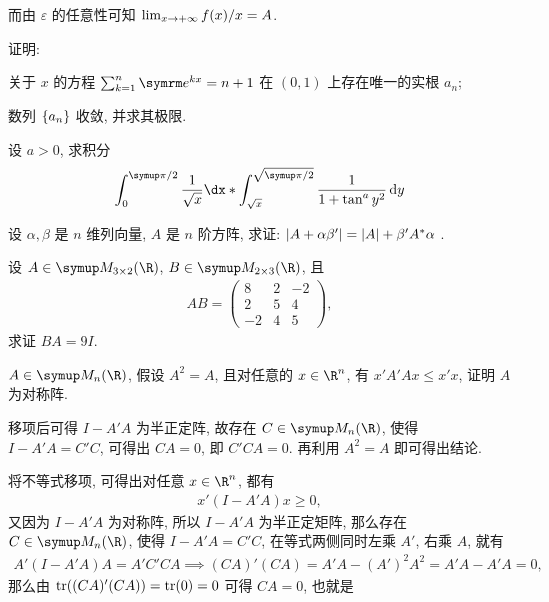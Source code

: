 \begin{exercise}[series=exer]
\begin{answer}
      而由 $ \varepsilon $ 的任意性可知 $ \lim_{x \to +\infty} f(x)/x = A $.
  \end{answer}
  \item 证明: \begin{exercise}
      \item 关于 $ x $ 的方程 $ \sum_{k=1}^{n} \me^{kx} = n + 1 $ 在 $ (0, 1) $ 上存在唯一的实根 $ a_{n} $;
      \item 数列 $ \qty{a_{n}} $ 收敛, 并求其极限.
  \end{exercise}
  \item 设 $ a > 0 $, 求积分
  \begin{align*}
      \int_{0}^{\pi/2} \frac{1}{\sqrt{x}} \dx* \int_{\sqrt{x}}^{\sqrt{\pi/2}} \frac{1}{1 + \tan^{a}y^{2}} \dd{y}
  \end{align*}
  \item 设 $ \alpha, \beta $ 是 $ n $ 维列向量, $ A $ 是 $ n $ 阶方阵, 求证: $ \abs{A + \alpha\beta'} = \abs{A} + \beta'A^{*}\alpha $ .
  \item 设 $ A \in \MM[\R][3\times 2] $, $ B \in \MM[\R][2 \times 3] $, 且
  \begin{align*}
      AB = \begin{pmatrix}
          8 & 2 & -2 \\
          2 & 5 & 4 \\
          -2 & 4 & 5
      \end{pmatrix},
  \end{align*}
  求证 $ BA = 9 I $.
  \item $ A\in \MM $, 假设 $ A^{2} = A $, 且对任意的 $ x \in \R^{n} $, 有 $ x'A'Ax \le x'x $, 证明 $ A $ 为对称阵.
  \begin{hint}
      移项后可得 $ I - A'A $ 为半正定阵, 故存在 $ C \in \MM $, 使得 $ I - A'A = C'C $, 可得出 $ CA = 0 $, 即 $ C'CA = 0 $. 再利用 $ A^{2} = A $ 即可得出结论.
  \end{hint}
  \begin{answer}
      将不等式移项, 可得出对任意 $ x \in \R^{n} $, 都有
      \begin{align*}
          x'(I - A'A)x \ge 0,
      \end{align*}
      又因为 $ I - A'A $ 为对称阵, 所以 $ I - A'A $ 为半正定矩阵, 那么存在 $ C \in \MM $, 使得 $ I - A'A = C'C $, 在等式两侧同时左乘 $ A' $, 右乘 $ A $, 就有
      \begin{align*}
          A'(I - A'A)A = A'C'CA \implies (CA)'(CA) = A'A - (A')^{2}A^{2} = A'A - A'A = 0,
      \end{align*}
      那么由 $ \tr((CA)'(CA)) = \tr(0) = 0 $ 可得 $ CA = 0 $, 也就是

\end{answer}
\end{exercise}
